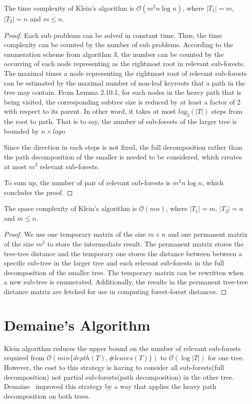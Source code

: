\begin{lemma}
The time complexity of Klein's algorithm is $\mathcal{O}(m^2n \log n)$, where $\left\vert T_1 \right\vert = m$, $\left\vert T_2 \right\vert = n$ and $m \leq n$.
\end{lemma}
\begin{proof}
Each sub problems can be solved in constant time. Thus, the time complexity can be counted by the number of sub problems. According to the enumeration scheme from algorithm 3, the number can be counted by the occurring of each node representing as the rightmost root in relevant sub-forests. The maximal times a node representing the rightmost root of relevant sub-forests can be estimated by the maximal number of non-leaf keyroots that a path in the tree may contain. From Lemma 2.10.1, for each nodes in the heavy path that is being visited, the corresponding subtree size is reduced by at least a factor of 2 with respect to its parent. In other word, it takes at most $log_2(\left\vert T \right\vert)$ steps from the root to path. That is to say, the number of sub-forests of the larger tree is bounded by $n \times log n$

Since the direction in each steps is not fixed, the full decomposition rather than the path decomposition of the smaller is needed to be considered, which creates at most $m^2$ relevant sub-forests.

To sum up, the number of pair of relevant sub-forests is $m^2n \log n$, which concludes the proof.
\end{proof}
\begin{lemma}
The space complexity of Klein's algorithm is $\mathcal{O}(mn)$, where $\left\vert T_1 \right\vert = m$, $\left\vert T_2 \right\vert = n$ and $m \leq n$. 
\end{lemma}
\begin{proof}
We use one temporary matrix of the size $m \times n$ and one permanent matrix of the size $m^2$ to store the intermediate result. The permanent matrix stores the tree-tree distance and the temporary one stores the distance between between a specific sub-tree in the larger tree and each relevant sub-forests in the full decomposition of the smaller tree. The temporary matrix can be rewritten when a new sub-tree is enumerated. Additionally, the results in the permanent tree-tree distance matrix are fetched for use in computing forest-forest distances.
\end{proof}

\section{Demaine's Algorithm}
Klein algorithm reduces the upper bound on the number of relevant sub-forests required from $\mathcal{O}(min\{depth(T), \#leaves(T)\})$ to $\mathcal{O}(\log \left\vert T \right\vert)$ for one tree. However, the cost to this strategy is having to consider all sub-forests(full decomposition) not partial sub-forests(path decomposition) in the other tree. Demaine~\cite{demaine2009optimal} improved this strategy by a way that applies the heavy path decomposition on both trees. 


